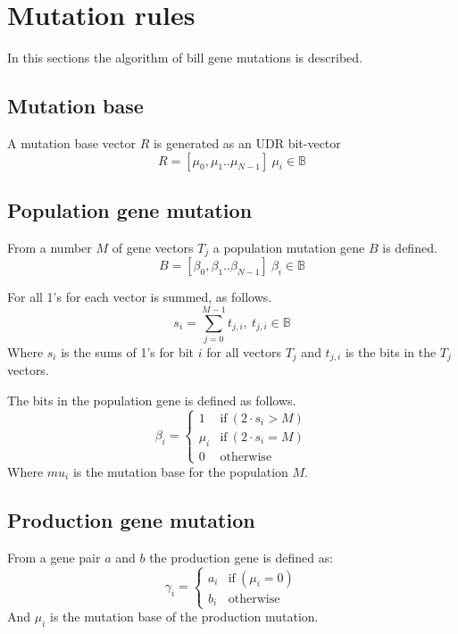 \section{Mutation rules}\label{sec:mutation}

In this sections the algorithm of bill gene mutations is described.

\subsection{Mutation base}
A mutation base vector $R$ is generated as an UDR bit-vector
\begin{equation}
 R = [\mu_{0}, \mu_{1} .. \mu_{N-1}] ~ \mu_{i} \in \mathbb{B}
\end{equation}

\subsection{Population gene mutation}
From a number $M$ of gene vectors $T_j$ a population mutation gene $B$ is defined.
\begin{equation}
 B = [\beta_{0}, \beta_{1} .. \beta_{N-1}] ~ \beta_{i} \in \mathbb{B}
\end{equation}

For all 1's for each vector is summed, as follows.
\begin{equation}
 s_{i} = \sum_{j=0}^{M-1}  t_{j,i}, ~ t_{j,i} \in \mathbb{B}
\end{equation}
Where $s_i$ is the sums of 1's for bit $i$ for all vectors $T_j$ and $t_{j,i}$ is the bits in the $T_j$ vectors.

The bits in the population gene is defined as follows.
\begin{equation}
 \beta_{i} = 
  \begin{cases}
  1 & \text{if} ~ ( 2 \cdot s_i > M) \\
  \mu_i & \text{if} ~ ( 2 \cdot s_i = M) \\
  0 & \text{otherwise}     
 \end{cases}
\end{equation}
Where $mu_i$ is the mutation base for the population $M$.

\subsection{Production gene mutation}
From a gene pair $a$ and $b$ the production gene is defined as:
\begin{equation}
 \gamma_{i} = 
  \begin{cases}
  a_i & \text{if} ~ ( \mu_i = 0) \\
  b_i & \text{otherwise}     
 \end{cases}
\end{equation}
And $\mu_i$ is the mutation base of the production mutation.

